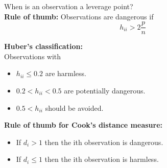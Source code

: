 When is an observation a leverage point?\\
\textbf{Rule of thumb:} Observations are dangerous if\\
\begin{equation}
  h_{ii} > 2 \frac{p}{n}
\end{equation}

\textbf{Huber's classification:}\\ Observations with
\begin{itemize}
  \item $h_{ii} \leq 0.2$ are harmless.
  \item $ 0.2 < h_{ii} < 0.5$ are potentially dangerous.
  \item $0.5 < h_{ii}$ should be avoided.
\end{itemize}

\textbf{Rule of thumb for Cook's distance measure:}\\
\begin{itemize}
  \item If $d_i > 1$ then the ith observation is dangerous.
  \item If $d_i \leq 1$ then the ith observation is harmless.
\end{itemize}


